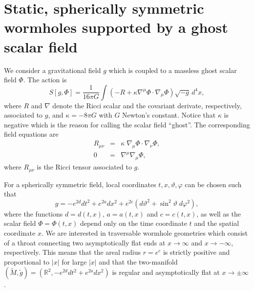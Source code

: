 \documentclass[           %
               showpacs,            %
               preprintnumbers,     %
               aps,                 %
               prd,                 %
               superscriptaddress,      %
               nofootinbib,         %
               tightenlines,        %
               floats,floatfix      %
               ]{revtex4}
\newcommand{\Real}{\mathbb{R}}
\begin{document}
\section{Static, spherically symmetric wormholes supported by a 
ghost scalar field}
\label{Sec:StaticSolutions}

We consider a gravitational field $g$ which is coupled to a massless
ghost scalar field $\Phi$. The action is
\begin{displaymath}
S[g,\Phi] = \frac{1}{16\pi G}
\int\left( -R + \kappa\nabla^\mu\Phi\cdot\nabla_\mu\Phi \right)
\sqrt{-g}\, d^4 x,
\end{displaymath}
where $R$ and $\nabla$ denote the Ricci scalar and the covariant
derivate, respectively, associated to $g$, and $\kappa = -8\pi G$ with
$G$ Newton's constant. Notice that $\kappa$ is negative which is the
reason for calling the scalar field ``ghost''. The corresponding field
equations are
\begin{eqnarray}
R_{\mu\nu} &=& \kappa\; \nabla_\mu\Phi \cdot \nabla_\nu\Phi, 
\label{Eq:Einstein}\\
0 &=& \nabla^\mu\nabla_\mu\Phi,
\label{Eq:KleinGordon}
\end{eqnarray}
where $R_{\mu\nu}$ is the Ricci tensor associated to $g$.

For a spherically symmetric field, local coordinates
$t,x,\vartheta,\varphi$ can be chosen such that
\begin{equation}
g = -e^{2d} dt^2 + e^{2a} dx^2 
 + e^{2c}\left( d\vartheta^2 + \sin^2\vartheta\; d\varphi^2 \right),
\label{Eq:SphericalMetric}
\end{equation}
where the functions $d = d(t,x)$, $a = a(t,x)$ and $c = c(t,x)$, as
well as the scalar field $\Phi = \Phi(t,x)$ depend only on the time
coordinate $t$ and the spatial coordinate $x$. We are interested in
traversable wormhole geometries which consist of a throat connecting
two asymptotically flat ends at $x\to \infty$ and $x\to -\infty$,
respectively. This means that the areal radius $r = e^c$ is strictly
positive and proportional to $|x|$ for large $|x|$ and that the
two-manifold $(\tilde{M},\tilde{g}) = (\Real^2,-e^{2d} dt^2 + e^{2a}
dx^2)$ is regular and asymptotically flat at $x\to \pm\infty$.
\end{document}
